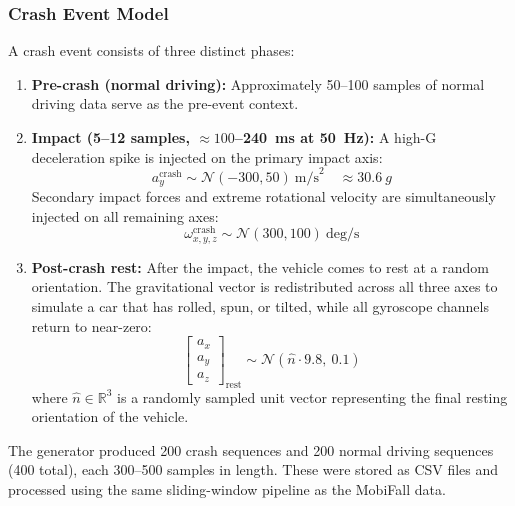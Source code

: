 \documentclass[journal]{IEEEtran}
\begin{document}
\subsubsection{Crash Event Model}
A crash event consists of three distinct phases:
\begin{enumerate}
  \item \textbf{Pre-crash (normal driving):} Approximately 50--100 samples of
        normal driving data serve as the pre-event context.

  \item \textbf{Impact (5--12 samples, $\approx 100$--240~ms at 50~Hz):}
        A high-G deceleration spike is injected on the primary impact axis:
        \begin{equation}
          a_y^{\text{crash}} \sim \mathcal{N}(-300, 50)~\text{m/s}^2
          \quad \approx 30.6~g
          \label{eq:crash_accel}
        \end{equation}
        Secondary impact forces and extreme rotational velocity are simultaneously
        injected on all remaining axes:
        \begin{equation}
          \omega_{x,y,z}^{\text{crash}} \sim \mathcal{N}(300, 100)~\text{deg/s}
          \label{eq:crash_gyro}
        \end{equation}

  \item \textbf{Post-crash rest:} After the impact, the vehicle comes to rest
        at a random orientation. The gravitational vector is redistributed across
        all three axes to simulate a car that has rolled, spun, or tilted, while
        all gyroscope channels return to near-zero:
        \begin{equation}
          \begin{bmatrix} a_x \\ a_y \\ a_z \end{bmatrix}_{\text{rest}}
          \sim \mathcal{N}\!\left(\hat{n} \cdot 9.8, \ 0.1\right)
          \label{eq:post_crash}
        \end{equation}
        where $\hat{n} \in \mathbb{R}^3$ is a randomly sampled unit vector
        representing the final resting orientation of the vehicle.
\end{enumerate}

The generator produced 200 crash sequences and 200 normal driving sequences
(400 total), each 300--500 samples in length. These were stored as CSV files
and processed using the same sliding-window pipeline as the MobiFall data.
\end{document}

